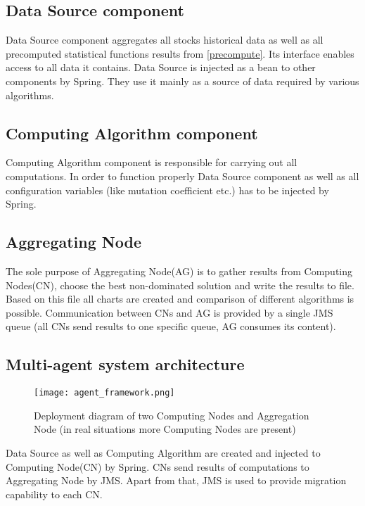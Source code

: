 \subsection{Data Source component}
\label{dataSource}

Data Source component aggregates all stocks historical data as well as all precomputed statistical functions results from \ref{precompute}.   
Its interface enables access to all data it contains. Data Source is injected as a bean to other components by Spring.
They use it mainly as a source of data required by various algorithms.

\subsection{Computing Algorithm component}

Computing Algorithm component is responsible for carrying out all computations.
In order to function properly Data Source component as well as all configuration variables (like mutation coefficient etc.) has to be injected by Spring.

\subsection{Aggregating Node}

The sole purpose of Aggregating Node(AG) is to gather results from Computing Nodes(CN), choose the best non-dominated solution and write the results to file. 
Based on this file all charts are created and comparison of different algorithms is possible.
Communication between CNs and AG is provided by a single JMS queue (all CNs send results to one specific queue, AG consumes its content).


\subsection{Multi-agent system architecture}
\label{multi-agent}

\begin{figure}[H]
  \begin{center}
    \texttt{[image: agent\_framework.png]}
  \end{center}
  \caption{Deployment diagram of two Computing Nodes and Aggregation Node (in real situations more Computing Nodes are present)}
\end{figure}

Data Source as well as Computing Algorithm are created and injected to Computing Node(CN) by Spring. 
CNs send results of computations to Aggregating Node by JMS. 
Apart from that, JMS is used to provide migration capability to each CN.

